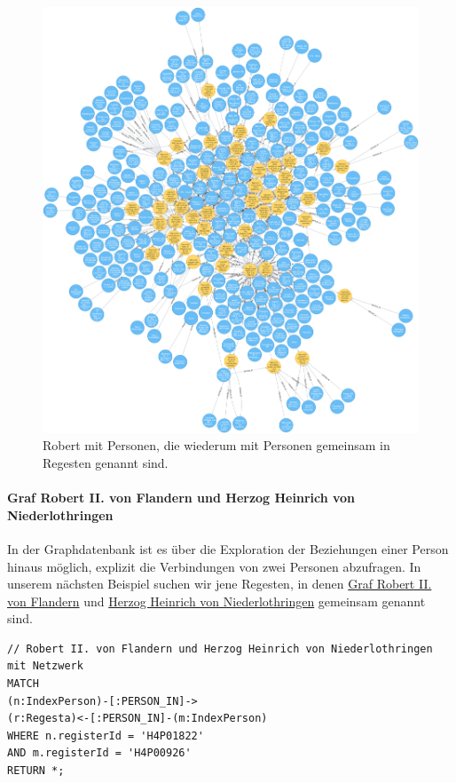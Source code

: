 \documentclass[12pt,ngerman,]{article}
\let\oldparagraph\paragraph
\renewcommand{\paragraph}[1]{\oldparagraph{#1}\mbox{}}
\begin{document}
\begin{figure}
\centering
\includegraphics{Bilder/RI2Graph/Robert-viel.png}
\caption{Robert mit Personen, die wiederum mit Personen gemeinsam in
Regesten genannt sind.}
\end{figure}

\paragraph{Graf Robert II. von Flandern und Herzog Heinrich von
Niederlothringen}\label{graf-robert-ii.-von-flandern-und-herzog-heinrich-von-niederlothringen}

In der Graphdatenbank ist es über die Exploration der Beziehungen einer
Person hinaus möglich, explizit die Verbindungen von zwei Personen
abzufragen. In unserem nächsten Beispiel suchen wir jene Regesten, in
denen \href{https://de.wikipedia.org/wiki/Robert_II._(Flandern)}{Graf
Robert II. von Flandern} und
\href{https://de.wikipedia.org/wiki/Heinrich_I._(Limburg)}{Herzog
Heinrich von Niederlothringen} gemeinsam genannt sind.

\begin{verbatim}
// Robert II. von Flandern und Herzog Heinrich von Niederlothringen mit Netzwerk
MATCH
(n:IndexPerson)-[:PERSON_IN]->
(r:Regesta)<-[:PERSON_IN]-(m:IndexPerson)
WHERE n.registerId = 'H4P01822'
AND m.registerId = 'H4P00926'
RETURN *;
\end{verbatim}
\end{document}
